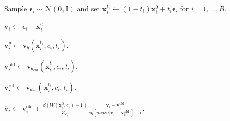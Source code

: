 \begin{algorithm}[H]
\begin{algorithmic}[1]

        \State Sample
        $\boldsymbol{\epsilon}_i\sim\mathcal{N}(\mathbf{0},\mathbf{I})$
        and set
        $\mathbf{x}_i^{t_i}
        \leftarrow
        (1-t_i)\mathbf{x}_i^0
        +
        t_i\boldsymbol{\epsilon}_i$
        for $i=1,\ldots,B$.

        \State $\mathbf{v}_i \leftarrow \boldsymbol{\epsilon}_i - \mathbf{x}_i^0$ 

        \State $\mathbf{v}_i^{\theta}
        \leftarrow
        \mathbf{v}_{\theta}
        (\mathbf{x}_i^{t_i},c_i,t_i)$.

        \State $\mathbf{v}_i^{\mathrm{old}}
        \leftarrow
        \mathbf{v}_{\theta_{\mathrm{old}}}
        (\mathbf{x}_i^{t_i},c_i,t_i)$.

        \State $\mathbf{v}_i^{\mathrm{ref}}
        \leftarrow
        \mathbf{v}_{\theta_{\mathrm{ref}}}
        (\mathbf{x}_i^{t_i},c_i,t_i)$.






        \State $\displaystyle
        \overline{\mathbf{v}}_{i}
        \leftarrow
        \mathbf{v}_i^{\mathrm{old}}
        +
        \frac{
        \beta
        \left(
        W(\mathbf{x}_i^0,c_i)-1
        \right)
        }{
        \bar{Z}_{c_i}
        }
        \frac{
        \mathbf{v}_i
        -
        \mathbf{v}_i^{\mathrm{old}}
        }{sg[mean |\mathbf{v}_i - \mathbf{v}_i^{\mathrm{old}}|] + \epsilon}
        .$



\end{algorithmic}
\end{algorithm}
